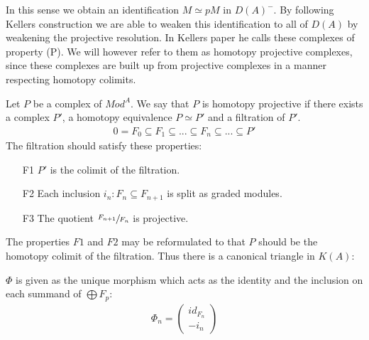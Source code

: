\documentclass[../thesis.tex]{subfiles}
\begin{document}
            \begin{center}
            \end{center}

            In this sense we obtain an identification $M \simeq pM$ in $D(A)^-$. By following Kellers construction we are able to weaken this identification to all of $D(A)$ by weakening the projective resolution. In Kellers paper he calls these complexes of property (P). We will however refer to them as homotopy projective complexes, since these complexes are built up from projective complexes in a manner respecting homotopy colimits.

            \begin{definition}
                Let $P$ be a complex of $Mod^A$. We say that $P$ is homotopy projective if there exists a complex $P'$, a homotopy equivalence $P \simeq P'$ and a filtration of $P'$.
                \begin{align*}
                    0 = F_0 \subseteq F_1 \subseteq ... \subseteq F_n \subseteq ... \subseteq P'
                \end{align*}
                The filtration should satisfy these properties:
                \begin{itemize}
                    \item[F1] $P'$ is the colimit of the filtration.
                    \item[F2] Each inclusion $i_n : F_n \subseteq F_{n+1}$ is split as graded modules.
                    \item[F3] The quotient $\sfrac{F_{n+1}}{F_n}$ is projective.
                \end{itemize}
            \end{definition}

            \begin{remark}
                The properties $F1$ and $F2$ may be reformulated to that $P$ should be the homotopy colimit of the filtration. Thus there is a canonical triangle in $K(A)$:
                \begin{center}
                \end{center}
                $\Phi$ is given as the unique morphism which acts as the identity and the inclusion on each summand of $\bigoplus F_p$:
                \begin{align*}
                    \Phi_n = \begin{pmatrix}
                        id_{F_n} \\ -i_n
                    \end{pmatrix}
                \end{align*}
            \end{remark}
\end{document}
